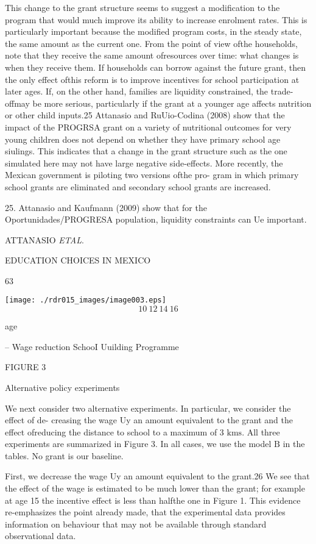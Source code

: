 This change to the grant structure seems to suggest a modification to the program that would much improve its ability to increase enrolment rates. This is particularly important because the modified program costs, in the steady state, the same amount as the current one. From the point of view ofthe households, note that they receive the same amount ofresources over time: what changes is when they receive them. If households can borrow against the future grant, then the only effect ofthis reform is to improve incentives for school participation at later ages. If, on the other hand, families are liquidity constrained, the trade-offmay be more serious, particularly if the grant at a younger age affects nutrition or other child inputs.25 Attanasio and RuUio-Codina (2008) show that the impact of the PROGRSA grant on a variety of nutritional outcomes for very young children does not depend on whether they have primary school age siulings. This indicates that a change in the grant structure such as the one simulated here may not have large negative side-effects. More recently, the Mexican government is piloting two versions ofthe pro- gram in which primary school grants are eliminated and secondary school grants are increased.

25. Attanasio and Kaufmann (2009) show that for the Oportunidades/PROGRESA population, liquidity constraints can Ue important.

ATTANASIO {\it ETAL}.

EDUCATION CHOICES IN MEXICO

63
\begin{center}
\texttt{[image: ./rdr015\_images/image003.eps]}
$$
10\ 12\ 14\ 16
$$
\end{center}
age

-- Wage reduction SchooI Uuilding Programme

FIGURE 3

Alternative policy experiments

We next consider two alternative experiments. In particular, we consider the effect of de- creasing the wage Uy an amount equivalent to the grant and the effect ofreducing the distance to school to a maximum of 3 $\mathrm{k}\mathrm{m}\mathrm{s}$. All three experiments are summarized in Figure 3. In all cases, we use the model $\mathrm{B}$ in the tables. No grant is our baseline.

First, we decrease the wage Uy an amount equivalent to the grant.26 We see that the effect of the wage is estimated to be much lower than the grant; for example at age 15 the incentive effect is less than halfthe one in Figure 1. This evidence re-emphasizes the point already made, that the experimental data provides information on behaviour that may not be available through standard observational data.


